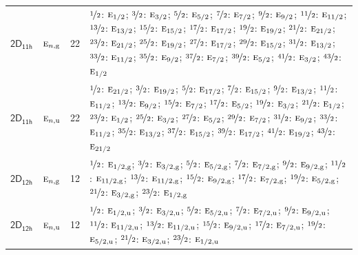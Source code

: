 \documentclass[10pt,a4paper]{article}
\numberwithin{equation}{section}
\newcommand{\grp}[1]{\mathsf{#1}}
\newcommand{\irr}[1]{\text{\normalfont\scshape #1}}
\newcommand{\ptag}[1]{\mathrm{#1}}
\newlength{\fillwidth}\newlength{\cellwidth}\newlength{\colwidth}
\begin{document}
{\begin{longtable}{@{}llr>{\RaggedRight\arraybackslash}p{\fillwidth}@{}}
\href{2D11h.pdf}{$\grp{2D_{11h}}$} & $\irr{e}_{n,\ptag{g}}$ & 22 & $\nicefrac{1}{2}$: $\irr{e}_{1/2}$; $\nicefrac{3}{2}$: $\irr{e}_{3/2}$; $\nicefrac{5}{2}$: $\irr{e}_{5/2}$; $\nicefrac{7}{2}$: $\irr{e}_{7/2}$; $\nicefrac{9}{2}$: $\irr{e}_{9/2}$; $\nicefrac{11}{2}$: $\irr{e}_{11/2}$; $\nicefrac{13}{2}$: $\irr{e}_{13/2}$; $\nicefrac{15}{2}$: $\irr{e}_{15/2}$; $\nicefrac{17}{2}$: $\irr{e}_{17/2}$; $\nicefrac{19}{2}$: $\irr{e}_{19/2}$; $\nicefrac{21}{2}$: $\irr{e}_{21/2}$; $\nicefrac{23}{2}$: $\irr{e}_{21/2}$; $\nicefrac{25}{2}$: $\irr{e}_{19/2}$; $\nicefrac{27}{2}$: $\irr{e}_{17/2}$; $\nicefrac{29}{2}$: $\irr{e}_{15/2}$; $\nicefrac{31}{2}$: $\irr{e}_{13/2}$; $\nicefrac{33}{2}$: $\irr{e}_{11/2}$; $\nicefrac{35}{2}$: $\irr{e}_{9/2}$; $\nicefrac{37}{2}$: $\irr{e}_{7/2}$; $\nicefrac{39}{2}$: $\irr{e}_{5/2}$; $\nicefrac{41}{2}$: $\irr{e}_{3/2}$; $\nicefrac{43}{2}$: $\irr{e}_{1/2}$\\
\href{2D11h.pdf}{$\grp{2D_{11h}}$} & $\irr{e}_{n,\ptag{u}}$ & 22 & $\nicefrac{1}{2}$: $\irr{e}_{21/2}$; $\nicefrac{3}{2}$: $\irr{e}_{19/2}$; $\nicefrac{5}{2}$: $\irr{e}_{17/2}$; $\nicefrac{7}{2}$: $\irr{e}_{15/2}$; $\nicefrac{9}{2}$: $\irr{e}_{13/2}$; $\nicefrac{11}{2}$: $\irr{e}_{11/2}$; $\nicefrac{13}{2}$: $\irr{e}_{9/2}$; $\nicefrac{15}{2}$: $\irr{e}_{7/2}$; $\nicefrac{17}{2}$: $\irr{e}_{5/2}$; $\nicefrac{19}{2}$: $\irr{e}_{3/2}$; $\nicefrac{21}{2}$: $\irr{e}_{1/2}$; $\nicefrac{23}{2}$: $\irr{e}_{1/2}$; $\nicefrac{25}{2}$: $\irr{e}_{3/2}$; $\nicefrac{27}{2}$: $\irr{e}_{5/2}$; $\nicefrac{29}{2}$: $\irr{e}_{7/2}$; $\nicefrac{31}{2}$: $\irr{e}_{9/2}$; $\nicefrac{33}{2}$: $\irr{e}_{11/2}$; $\nicefrac{35}{2}$: $\irr{e}_{13/2}$; $\nicefrac{37}{2}$: $\irr{e}_{15/2}$; $\nicefrac{39}{2}$: $\irr{e}_{17/2}$; $\nicefrac{41}{2}$: $\irr{e}_{19/2}$; $\nicefrac{43}{2}$: $\irr{e}_{21/2}$\\
\href{2D12h.pdf}{$\grp{2D_{12h}}$} & $\irr{e}_{n,\ptag{g}}$ & 12 & $\nicefrac{1}{2}$: $\irr{e}_{1/2,\ptag{g}}$; $\nicefrac{3}{2}$: $\irr{e}_{3/2,\ptag{g}}$; $\nicefrac{5}{2}$: $\irr{e}_{5/2,\ptag{g}}$; $\nicefrac{7}{2}$: $\irr{e}_{7/2,\ptag{g}}$; $\nicefrac{9}{2}$: $\irr{e}_{9/2,\ptag{g}}$; $\nicefrac{11}{2}$: $\irr{e}_{11/2,\ptag{g}}$; $\nicefrac{13}{2}$: $\irr{e}_{11/2,\ptag{g}}$; $\nicefrac{15}{2}$: $\irr{e}_{9/2,\ptag{g}}$; $\nicefrac{17}{2}$: $\irr{e}_{7/2,\ptag{g}}$; $\nicefrac{19}{2}$: $\irr{e}_{5/2,\ptag{g}}$; $\nicefrac{21}{2}$: $\irr{e}_{3/2,\ptag{g}}$; $\nicefrac{23}{2}$: $\irr{e}_{1/2,\ptag{g}}$\\
\href{2D12h.pdf}{$\grp{2D_{12h}}$} & $\irr{e}_{n,\ptag{u}}$ & 12 & $\nicefrac{1}{2}$: $\irr{e}_{1/2,\ptag{u}}$; $\nicefrac{3}{2}$: $\irr{e}_{3/2,\ptag{u}}$; $\nicefrac{5}{2}$: $\irr{e}_{5/2,\ptag{u}}$; $\nicefrac{7}{2}$: $\irr{e}_{7/2,\ptag{u}}$; $\nicefrac{9}{2}$: $\irr{e}_{9/2,\ptag{u}}$; $\nicefrac{11}{2}$: $\irr{e}_{11/2,\ptag{u}}$; $\nicefrac{13}{2}$: $\irr{e}_{11/2,\ptag{u}}$; $\nicefrac{15}{2}$: $\irr{e}_{9/2,\ptag{u}}$; $\nicefrac{17}{2}$: $\irr{e}_{7/2,\ptag{u}}$; $\nicefrac{19}{2}$: $\irr{e}_{5/2,\ptag{u}}$; $\nicefrac{21}{2}$: $\irr{e}_{3/2,\ptag{u}}$; $\nicefrac{23}{2}$: $\irr{e}_{1/2,\ptag{u}}$\\

\end{longtable}}
\end{document}

